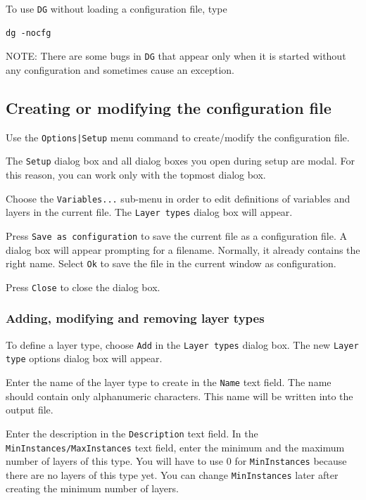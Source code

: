 \documentclass[a4paper,10pt]{report}
\begin{document}
To use {\tt DG} without loading a configuration file, type

\begin{verbatim}
dg -nocfg
\end{verbatim}

NOTE:   There are some bugs in {\tt DG} that appear only when it is started
without any configuration and sometimes cause an exception.

\subsection{Creating or modifying the configuration file}

Use the {\tt Options|Setup} menu command to create/modify the
configuration file.

The {\tt Setup} dialog box and all dialog boxes you open during setup
are modal. For this reason, you can work only with the topmost dialog
box.

Choose the {\tt Variables...} sub-menu in order to edit definitions of variables
and layers in the current file. The {\tt Layer types} dialog box will
appear.

Press {\tt Save as configuration} to save the current file as a
configuration file. A dialog box will appear prompting for a filename.
Normally, it already contains the right name. Select {\tt Ok} to save
the file in the current window as configuration.

Press {\tt Close} to close the dialog box.

\subsubsection{Adding, modifying and removing layer types}

To define a layer type, choose {\tt Add} in the {\tt Layer types}
dialog box. The new {\tt Layer type} options dialog box will appear.

Enter the name of the layer type to create in the {\tt Name} text
field. The name should contain only alphanumeric characters. This name
will be written into the output file.

Enter the description in the {\tt Description} text field. In the
{\tt MinInstances/MaxInstances} text field, enter the minimum and
the maximum number of layers of this type. You will have to use 0 for
{\tt MinInstances} because there are no layers of this type yet. You
can change {\tt MinInstances} later after creating the minimum number
of layers.
\end{document}

